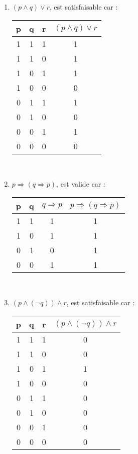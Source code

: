 \documentclass[a4paper, draft]{article}
\begin{document}
\begin{enumerate}
  \item $(p\land q) \lor r$, est satisfaisable car :\\

    \begin{tabular}
      {|c c c|c|}
      \hline
      p&q&r&$(p\land q) \lor r$\\
      \hline
      1&1&1&1\\
      1&1&0&1\\
      1&0&1&1\\
      1&0&0&0\\
      0&1&1&1\\
      0&1&0&0\\
      0&0&1&1\\
      0&0&0&0\\
      \hline
    \end{tabular}\\


  \item $p\Longrightarrow (q \Longrightarrow p)$, est valide car :\\

    \begin{tabular}
      {|c c|c|c|}
      \hline
      p&q&$q\Longrightarrow p$&$p\Longrightarrow (q \Longrightarrow p)$\\
      \hline
      1&1&1&1\\
      1&0&1&1\\
      0&1&0&1\\
      0&0&1&1\\
      \hline
    \end{tabular}\\


  \item $(p\land (\lnot q)) \land r$, est satisfaisable car :\\

    \begin{tabular}
      {|c c c|c|}
      \hline
      p&q&r&$(p\land (\lnot q)) \land r$\\
      \hline
      1&1&1&0\\
      1&1&0&0\\
      1&0&1&1\\
      1&0&0&0\\
      0&1&1&0\\
      0&1&0&0\\
      0&0&1&0\\
      0&0&0&0\\
      \hline
    \end{tabular}\\



\end{enumerate}
\end{document}
